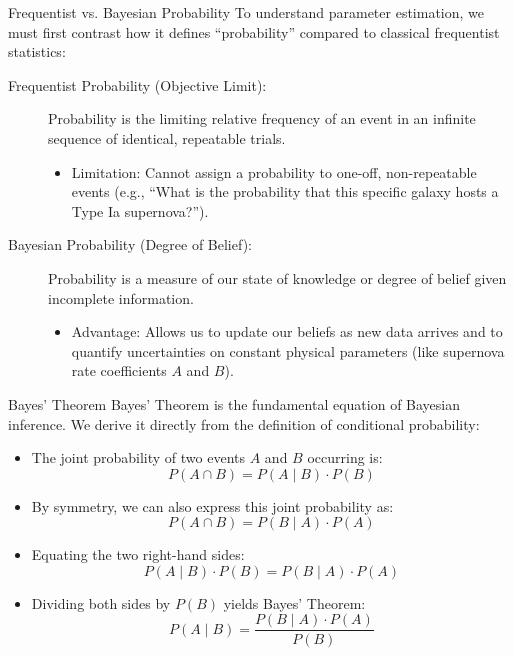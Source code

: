 \documentclass[9pt]{beamer}
\begin{document}
\begin{frame}{Frequentist vs. Bayesian Probability}
  To understand parameter estimation, we must first contrast how it defines ``probability'' compared to classical frequentist statistics:
  \begin{description}
    \item[Frequentist Probability (Objective Limit):]
      Probability is the limiting relative frequency of an event in an infinite sequence of identical, repeatable trials.
      \begin{itemize}
        \item \alert{Limitation:} Cannot assign a probability to one-off, non-repeatable events (e.g., ``What is the probability that this specific galaxy hosts a Type Ia supernova?'').
      \end{itemize}
    \item[Bayesian Probability (Degree of Belief):]
      Probability is a measure of our state of knowledge or degree of belief given incomplete information.
      \begin{itemize}
        \item \alert{Advantage:} Allows us to update our beliefs as new data arrives and to quantify uncertainties on constant physical parameters (like supernova rate coefficients $A$ and $B$).
      \end{itemize}
  \end{description}
\end{frame}

\begin{frame}{Bayes' Theorem}
  Bayes' Theorem is the fundamental equation of Bayesian inference. We derive it directly from the definition of conditional probability:
  \begin{itemize}
    \item The joint probability of two events $A$ and $B$ occurring is:
      $$P(A \cap B) = P(A \mid B) \cdot P(B)$$
    \item By symmetry, we can also express this joint probability as:
      $$P(A \cap B) = P(B \mid A) \cdot P(A)$$
    \item Equating the two right-hand sides:
      $$P(A \mid B) \cdot P(B) = P(B \mid A) \cdot P(A)$$
    \item Dividing both sides by $P(B)$ yields Bayes' Theorem:
      $$P(A \mid B) = \frac{P(B \mid A) \cdot P(A)}{P(B)}$$
  \end{itemize}
\end{frame}
\end{document}
